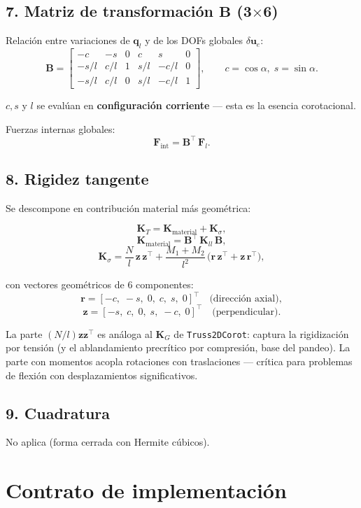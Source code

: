 \documentclass[11pt,letterpaper,oneside]{report}
\begin{document}
\subsection{7. Matriz de transformación $\mathbf B$ (3\ensuremath{\times}6)}
Relación entre variaciones de $\mathbf q_l$ y de los DOFs globales $\delta\mathbf u_e$:
\[
\mathbf B = \begin{bmatrix}
-c & -s & 0 & c & s & 0 \\
-s/l & c/l & 1 & s/l & -c/l & 0 \\
-s/l & c/l & 0 & s/l & -c/l & 1
\end{bmatrix}, \qquad c = \cos\alpha,\; s = \sin\alpha.
\]

$c, s$ y $l$ se evalúan en \textbf{configuración corriente} --- esta es la esencia corotacional.

Fuerzas internas globales:
\[
\mathbf F_{\text{int}} = \mathbf B^\top\,\mathbf F_l.
\]

\subsection{8. Rigidez tangente}
Se descompone en contribución material más geométrica:

\[
\mathbf K_T = \mathbf K_{\text{material}} + \mathbf K_\sigma,
\]
\[
\mathbf K_{\text{material}} = \mathbf B^\top\,\mathbf K_{ll}\,\mathbf B,
\]
\[
\mathbf K_\sigma = \frac{N}{l}\,\mathbf z\,\mathbf z^\top + \frac{M_1 + M_2}{l^2}\,\bigl(\mathbf r\,\mathbf z^\top + \mathbf z\,\mathbf r^\top\bigr),
\]

con vectores geométricos de 6 componentes:
\[
\mathbf r = [-c,\;-s,\;0,\; c,\; s,\;0]^\top \quad \text{(dirección axial)},
\]
\[
\mathbf z = [-s,\; c,\;0,\; s,\;-c,\;0]^\top \quad \text{(perpendicular)}.
\]

La parte $(N/l)\mathbf z\mathbf z^\top$ es análoga al $\mathbf K_G$ de \texttt{Truss2DCorot}: captura la rigidización por tensión (y el ablandamiento precrítico por compresión, base del pandeo). La parte con momentos acopla rotaciones con traslaciones --- crítica para problemas de flexión con desplazamientos significativos.

\subsection{9. Cuadratura}
No aplica (forma cerrada con Hermite cúbicos).


\section{Contrato de implementación}
\end{document}

